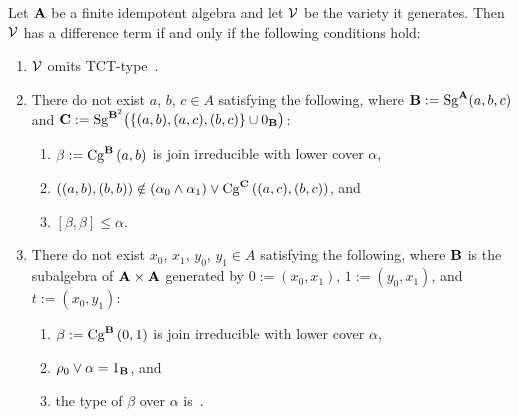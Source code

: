 \begin{theorem}\label{thm:algorithm}
Let $\alg A$ be a finite idempotent algebra and let $\sV$ be the variety
it generates. Then $\sV$ has a difference term if and only if the
following conditions hold:
\begin{enumerate}

   \item \label{it:1}$\sV$ omits TCT-type~\utyp.
  \item \label{it:2}
    There do not exist $a$, $b$, $c\in A$
    satisfying the following, where
    $\alg B := \Sg^{\alg A}(a, b, c)$ and
    $\alg C:=\Sg^{\alg{B}^2}\bigl(\{(a,b), (a,c), (b, c)\}
                        \cup 0_{\alg B}\bigr)$:
    \begin{enumerate}
      \item \label{it:2a}
        $\beta := \Cga a b B$ is join irreducible with lower cover $\alpha$,
      \item \label{it:2b}
        $((a,b),(b,b)) \notin (\alpha_0 \meet \alpha_1) \join \Cga {(a,c)} {(b,c)} C$,  and
      \item \label{it:2c}
        $[\beta,\beta] \le \alpha$.
    \end{enumerate}

  \item \label{it:3}
    There do not exist $x_0$, $x_1$, $y_0$, $y_1\in A$ satisfying
    the following, where $\alg B$ is the subalgebra of
    $\alg A \times \alg A$ generated by $0 := (x_0, x_1)$, $1 := (y_0,x_1)$,
    and $t := (x_0,y_1)$:
    \begin{enumerate}
      \item \label{it:3a}
        $\beta := \Cga01{B}$ is join irreducible with lower cover $\alpha$,
      \item \label{it:3b}
        $\rho_0 \join \alpha = 1_{\alg B}$, and
      \item \label{it:3c}
        the type of $\beta$ over  $\alpha$ is~\atyp.
    \end{enumerate}
  \end{enumerate}
\end{theorem}

